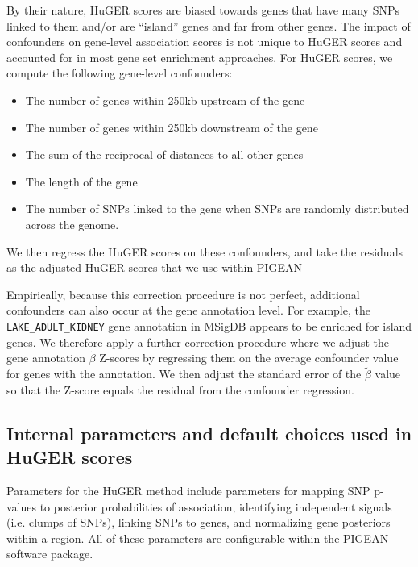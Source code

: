 {By their nature, HuGER scores are biased towards genes that have many
SNPs linked to them and/or are ``island'' genes and far from other
genes. The impact of confounders on gene-level association scores is
not unique to HuGER scores and accounted for in most gene set
enrichment approaches\cite{}. For HuGER scores, we compute the
following gene-level confounders:
\begin{itemize}
  \item The number of genes within 250kb upstream of the gene
  \item The number of genes within 250kb downstream of the gene
  \item The sum of the reciprocal of distances to all other genes
  \item The length of the gene
  \item The number of SNPs linked to the gene when SNPs are randomly
    distributed across the genome.
\end{itemize}
We then regress the HuGER scores on these confounders, and take the
residuals as the adjusted HuGER scores that we use within PIGEAN

Empirically, because this correction procedure is not perfect, additional confounders can also occur at the gene annotation
level. For example, the \texttt{LAKE\_ADULT\_KIDNEY}\cite{} gene annotation in
MSigDB\cite{} appears to be enriched for island genes. We therefore
apply a further correction procedure where we adjust the gene annotation
$\tilde{\beta}$ Z-scores by regressing them on the average confounder value for
genes with the annotation. We then adjust the standard error of the
$\tilde{\beta}$ value so that the Z-score equals the residual from the
confounder regression.

\subsection{Internal parameters and default choices used in HuGER scores}

Parameters for the HuGER method include parameters for mapping SNP
p-values to posterior probabilities of association, identifying
independent signals (i.e. clumps of SNPs), linking SNPs to genes, and
normalizing gene posteriors within a region. All of these parameters
are configurable within the PIGEAN software package.

}
